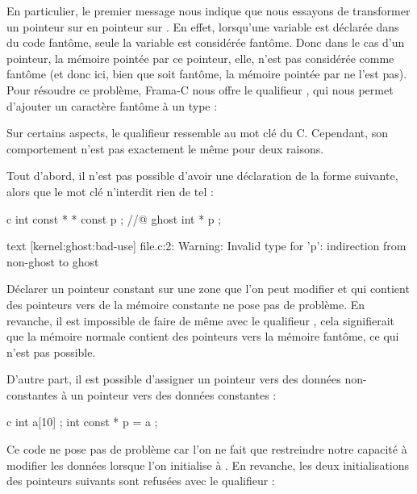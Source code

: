 En particulier, le premier message nous indique que nous essayons de transformer
un pointeur sur  en pointeur sur
. En effet, lorsqu'une variable est déclarée dans du code fantôme,
seule la variable est considérée fantôme. Donc dans le cas d'un pointeur, la mémoire
pointée par ce pointeur, elle, n'est pas considérée comme fantôme (et donc ici, bien
que  soit fantôme, la mémoire pointée par  ne l'est
pas). Pour résoudre ce problème, Frama-C nous offre le qualifieur
, qui nous permet d'ajouter un caractère fantôme
à un type :




Sur certains aspects, le qualifieur  ressemble
au mot clé  du C. Cependant, son comportement n'est pas
exactement le même pour deux raisons.


Tout d'abord, il n'est pas possible d'avoir une déclaration de la forme suivante,
alors que le mot clé  n'interdit rien de tel :


\begin{CodeBlock}{c}
int const * * const p ;
//@ ghost int \ghost * * p ;
\end{CodeBlock}


\begin{CodeBlock}{text}
[kernel:ghost:bad-use] file.c:2: Warning:
  Invalid type for 'p': indirection from non-ghost to ghost
\end{CodeBlock}



Déclarer un pointeur constant sur une zone que l'on peut modifier et qui contient
des pointeurs vers de la mémoire constante ne pose pas de problème. En revanche,
il est impossible de faire de même avec le qualifieur
, cela signifierait que la mémoire normale
contient des pointeurs vers la mémoire fantôme, ce qui n'est pas possible.


D'autre part, il est possible d'assigner un pointeur
vers des données non-constantes à un pointeur vers des données constantes :


\begin{CodeBlock}{c}
int a[10] ;
int const * p = a ;
\end{CodeBlock}


Ce code ne pose pas de problème car l'on ne fait que restreindre notre capacité
à modifier les données lorsque l'on initialise  à .
En revanche, les deux initialisations des pointeurs suivants sont refusées
avec le qualifieur  :


